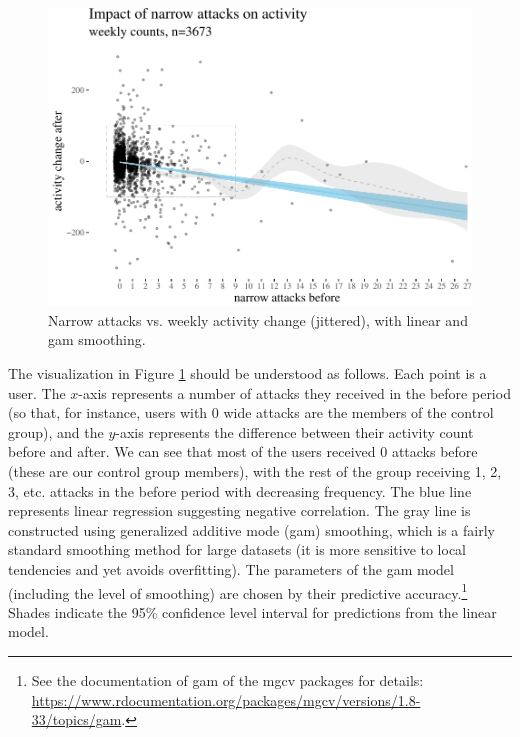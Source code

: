 \documentclass[10pt,dvipsnames]{scrartcl}
\begin{document}
\footnotesize

\normalsize

\begin{figure}

\begin{center}\includegraphics[width=0.85\linewidth]{quittingShortAbridgedRevisions3_files/figure-latex/unnamed-chunk-3-1} \end{center}
\caption{Narrow attacks vs. weekly activity change (jittered), with  linear and gam smoothing.}
\label{fig:highPlots}
\end{figure}

The visualization in Figure \ref{fig:highPlots} should be understood as
follows. Each point is a user. The \(x\)-axis represents a number of
attacks they received in the \textsf{before} period (so that, for
instance, users with 0 wide attacks are the members of the control
group), and the \(y\)-axis represents the difference between their
activity count \textsf{before} and \textsf{after}. We can see that most
of the users received 0 attacks before (these are our control group
members), with the rest of the group receiving 1, 2, 3, etc. attacks in
the \textsf{before} period with decreasing frequency. The blue line
represents linear regression suggesting negative correlation. The gray
line is constructed using generalized additive mode (gam) smoothing,
which is a fairly standard smoothing method for large datasets (it is
more sensitive to local tendencies and yet avoids overfitting). The
parameters of the gam model (including the level of smoothing) are
chosen by their predictive
accuracy.\footnote{See  the documentation of \textsf{gam} of the \textsf{mgcv} packages for details: \url{https://www.rdocumentation.org/packages/mgcv/versions/1.8-33/topics/gam}.}
Shades indicate the 95\% confidence level interval for predictions from
the linear model.
\end{document}
